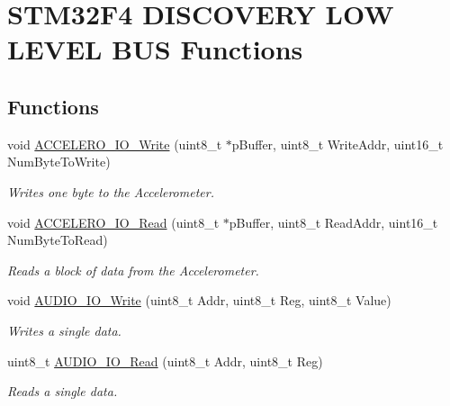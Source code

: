 \hypertarget{group___s_t_m32_f4___d_i_s_c_o_v_e_r_y___l_o_w___l_e_v_e_l___b_u_s___functions}{}\section{S\+T\+M32\+F4 D\+I\+S\+C\+O\+V\+E\+RY L\+OW L\+E\+V\+EL B\+US Functions}
\label{group___s_t_m32_f4___d_i_s_c_o_v_e_r_y___l_o_w___l_e_v_e_l___b_u_s___functions}
\subsection*{Functions}
\begin{DoxyCompactItemize}
\item 
void \mbox{\hyperlink{group___s_t_m32_f4___d_i_s_c_o_v_e_r_y___l_o_w___l_e_v_e_l___b_u_s___functions_gaeedea8061d4abde8cd304b454334ae42}{A\+C\+C\+E\+L\+E\+R\+O\+\_\+\+I\+O\+\_\+\+Write}} (uint8\+\_\+t $\ast$p\+Buffer, uint8\+\_\+t Write\+Addr, uint16\+\_\+t Num\+Byte\+To\+Write)
\begin{DoxyCompactList}\small\item\em Writes one byte to the Accelerometer. \end{DoxyCompactList}\item 
void \mbox{\hyperlink{group___s_t_m32_f4___d_i_s_c_o_v_e_r_y___l_o_w___l_e_v_e_l___b_u_s___functions_ga78371d00a01f2a0cdd613306e4c4e58f}{A\+C\+C\+E\+L\+E\+R\+O\+\_\+\+I\+O\+\_\+\+Read}} (uint8\+\_\+t $\ast$p\+Buffer, uint8\+\_\+t Read\+Addr, uint16\+\_\+t Num\+Byte\+To\+Read)
\begin{DoxyCompactList}\small\item\em Reads a block of data from the Accelerometer. \end{DoxyCompactList}\item 
void \mbox{\hyperlink{group___s_t_m32_f4___d_i_s_c_o_v_e_r_y___l_o_w___l_e_v_e_l___b_u_s___functions_ga269d6aa92989351e75f6d58378e3b9ba}{A\+U\+D\+I\+O\+\_\+\+I\+O\+\_\+\+Write}} (uint8\+\_\+t Addr, uint8\+\_\+t Reg, uint8\+\_\+t Value)
\begin{DoxyCompactList}\small\item\em Writes a single data. \end{DoxyCompactList}\item 
uint8\+\_\+t \mbox{\hyperlink{group___s_t_m32_f4___d_i_s_c_o_v_e_r_y___l_o_w___l_e_v_e_l___b_u_s___functions_gaf8740cdd8dfc7929d23d52d6fcf0901f}{A\+U\+D\+I\+O\+\_\+\+I\+O\+\_\+\+Read}} (uint8\+\_\+t Addr, uint8\+\_\+t Reg)
\begin{DoxyCompactList}\small\item\em Reads a single data. \end{DoxyCompactList}\end{DoxyCompactItemize}


